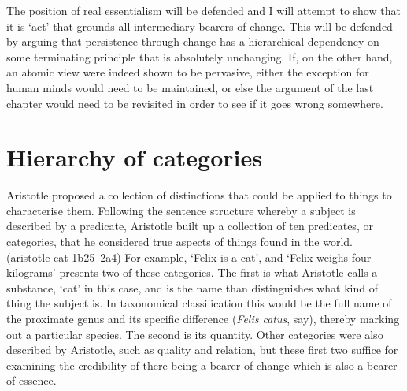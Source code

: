 The position of real essentialism will be defended and I will attempt to show that it is `act' that grounds all intermediary bearers of change.
This will be defended by arguing that persistence through change has a hierarchical dependency on some terminating principle that is absolutely unchanging. If, on the other hand, an atomic view were indeed shown to be pervasive, either the exception for human minds would need to be maintained, or else the argument of the last chapter would need to be revisited in order to see if it goes wrong somewhere.

\section{Hierarchy of categories}

Aristotle proposed a collection of distinctions that could be applied to things to characterise them. Following the sentence structure whereby a subject is described by a predicate, Aristotle built up a collection of ten predicates, or categories, that he considered true aspects of things found in the world. (\acrshort{aristotle-cat} 1b25--2a4) For example, `Felix is a cat', and `Felix weighs four kilograms' presents two of these categories. The first is what Aristotle calls a substance, `cat' in this case, and is the name than distinguishes what kind of thing the subject is. In taxonomical classification this would be the full name of the proximate genus and its specific difference (\emph{Felis catus}, say), thereby marking out a particular species. The second is its quantity. Other categories were also described by Aristotle, such as quality and relation, but these first two suffice for examining the credibility of there being a bearer of change which is also a bearer of essence.

